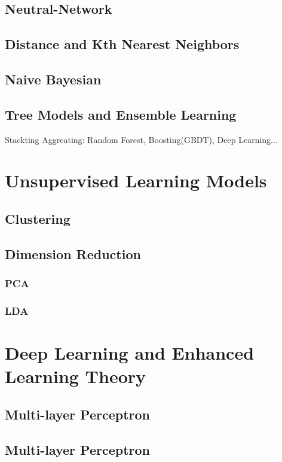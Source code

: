 \documentclass[11pt, openany]{book}              %
\begin{document}
\chapter{Neutral-Network}

\chapter{Distance and Kth Nearest Neighbors}

\chapter{Naive Bayesian}

\chapter{Tree Models and Ensemble Learning}

Stackting Aggreating: Random Forest, Boosting(GBDT), Deep Learning...

\part{Unsupervised Learning Models}

\chapter{Clustering}

\chapter{Dimension Reduction}
\section{PCA}
\section{LDA}


\part{Deep Learning and Enhanced Learning Theory}

\chapter{Multi-layer Perceptron}

\chapter{Multi-layer Perceptron}
\end{document}
